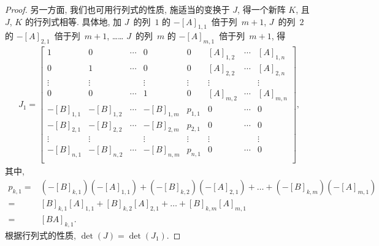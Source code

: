 \documentclass[../libro.tex]{subfiles}
\begin{document}
\begin{proof}
    另一方面, 我们也可用行列式的性质,
    施适当的变换于 \(J\),
    得一个新阵 \(K\),
    且 \(J\), \(K\) 的行列式相等.
    具体地, 加
    \(J\)~的列~\(1\) 的 \(-[A]_{1,1}\)~倍于列~\(m+1\),
    \(J\)~的列~\(2\) 的 \(-[A]_{2,1}\)~倍于列~\(m+1\),
    ……
    \(J\)~的列~\(m\) 的 \(-[A]_{m,1}\)~倍于列~\(m+1\),
    得
    \begin{align*}
        J_1 =
        \begin{bmatrix}
            1          & 0          & \cdots & 0          &
            0          & [A]_{1,2}  & \cdots & [A]_{1,n}    \\
            0          & 1          & \cdots & 0          &
            0          & [A]_{2,2}  & \cdots & [A]_{2,n}    \\
            \vdots     & \vdots     & {}     & \vdots     &
            \vdots     & \vdots     & {}     & \vdots       \\
            0          & 0          & \cdots & 1          &
            0          & [A]_{m,2}  & \cdots & [A]_{m,n}    \\
            -[B]_{1,1} & -[B]_{1,2} & \cdots & -[B]_{1,m} &
            p_{1,1}    & 0          & \cdots & 0            \\
            -[B]_{2,1} & -[B]_{2,2} & \cdots & -[B]_{2,m} &
            p_{2,1}    & 0          & \cdots & 0            \\
            \vdots     & \vdots     & {}     & \vdots     &
            \vdots     & \vdots     & {}     & \vdots       \\
            -[B]_{n,1} & -[B]_{n,2} & \cdots & -[B]_{n,m} &
            p_{n,1}    & 0          & \cdots & 0            \\
        \end{bmatrix},
    \end{align*}
    其中,
    \begin{align*}
        p_{k,1}
        = {} &
        (-[B]_{k,1})(-[A]_{1,1})
        + (-[B]_{k,2})(-[A]_{2,1})
        + \dots
        + (-[B]_{k,m})(-[A]_{m,1})
        \\
        = {} &
        [B]_{k,1} [A]_{1,1}
        + [B]_{k,2} [A]_{2,1}
        + \dots
        + [B]_{k,m} [A]_{m,1}
        \\
        = {} &
        [BA]_{k,1}.
    \end{align*}
    根据行列式的性质,
    \(\det {(J)} = \det {(J_1)}\).


\end{proof}
\end{document}
